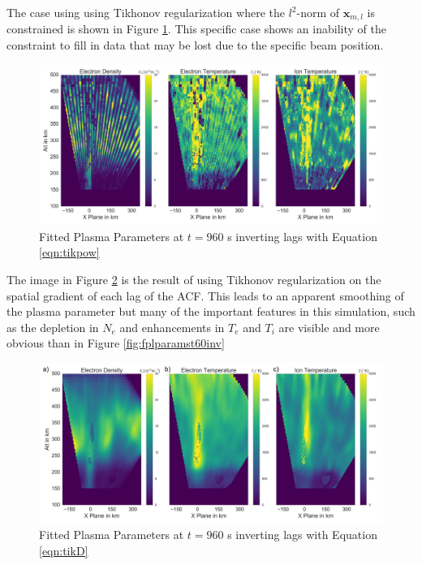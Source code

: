 The case using using Tikhonov regularization where the $l^2$-norm of $\mathbf{x}_{m,l}$ is constrained is shown in Figure \ref{fig:tikpow}. This specific case shows an inability of the constraint to fill in data that may be lost due to the specific beam position. 

\begin{figure}[!ht]
\centering
\includegraphics[width=6in]{tikfitted}
\caption{Fitted Plasma Parameters at $t=960$ s inverting lags with Equation \ref{eqn:tikpow}}
\label{fig:tikpow}
\end{figure}

The image in Figure \ref{fig:tikD} is the result of using Tikhonov regularization on the spatial gradient of each lag of the ACF. This leads to an apparent smoothing of the plasma parameter but many of the important features in this simulation, such as the depletion in $N_e$ and enhancements in $T_e$ and $T_i$ are visible and more obvious than in Figure \ref{fig:fplparamst60inv}
\begin{figure}[!ht]
\centering
\includegraphics[width=6in]{tikdfitted}
\caption{Fitted Plasma Parameters at $t=960$ s inverting lags with Equation \ref{eqn:tikD}}
\label{fig:tikD}
\end{figure}

